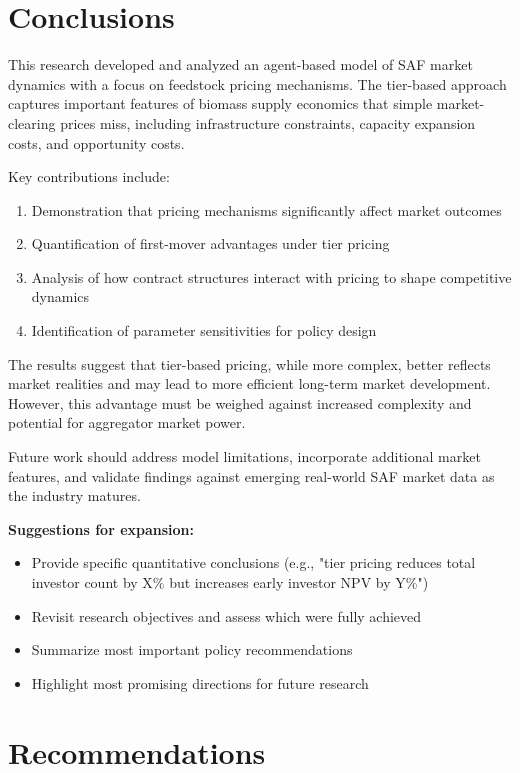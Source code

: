 \documentclass[10.5pt]{article}
\begin{document}
\newpage
\section{Conclusions}

This research developed and analyzed an agent-based model of SAF market dynamics with a focus on feedstock pricing mechanisms. The tier-based approach captures important features of biomass supply economics that simple market-clearing prices miss, including infrastructure constraints, capacity expansion costs, and opportunity costs.

Key contributions include:

\begin{enumerate}
    \item Demonstration that pricing mechanisms significantly affect market outcomes
    \item Quantification of first-mover advantages under tier pricing
    \item Analysis of how contract structures interact with pricing to shape competitive dynamics
    \item Identification of parameter sensitivities for policy design
\end{enumerate}

The results suggest that tier-based pricing, while more complex, better reflects market realities and may lead to more efficient long-term market development. However, this advantage must be weighed against increased complexity and potential for aggregator market power.

Future work should address model limitations, incorporate additional market features, and validate findings against emerging real-world SAF market data as the industry matures.

\textbf{Suggestions for expansion:}
\begin{itemize}
    \item Provide specific quantitative conclusions (e.g., "tier pricing reduces total investor count by X\% but increases early investor NPV by Y\%")
    \item Revisit research objectives and assess which were fully achieved
    \item Summarize most important policy recommendations
    \item Highlight most promising directions for future research
\end{itemize}

\section{Recommendations}
\end{document}

